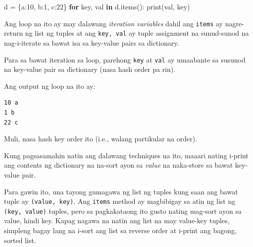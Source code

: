 \documentclass[10pt,]{book}
\newenvironment{Shaded}{}{}
\newcommand{\BuiltInTok}[1]{\textcolor[rgb]{0.00,0.50,0.00}{#1}}
\newcommand{\ControlFlowTok}[1]{\textcolor[rgb]{0.00,0.44,0.13}{\textbf{#1}}}
\newcommand{\DecValTok}[1]{\textcolor[rgb]{0.25,0.63,0.44}{#1}}
\newcommand{\KeywordTok}[1]{\textcolor[rgb]{0.00,0.44,0.13}{\textbf{#1}}}
\newcommand{\NormalTok}[1]{#1}
\newcommand{\OperatorTok}[1]{\textcolor[rgb]{0.40,0.40,0.40}{#1}}
\newcommand{\StringTok}[1]{\textcolor[rgb]{0.25,0.44,0.63}{#1}}
\begin{document}
\begin{Shaded}
\begin{Highlighting}[]
\NormalTok{d }\OperatorTok{=}\NormalTok{ \{}\StringTok{\textquotesingle{}a\textquotesingle{}}\NormalTok{:}\DecValTok{10}\NormalTok{, }\StringTok{\textquotesingle{}b\textquotesingle{}}\NormalTok{:}\DecValTok{1}\NormalTok{, }\StringTok{\textquotesingle{}c\textquotesingle{}}\NormalTok{:}\DecValTok{22}\NormalTok{\}}
\ControlFlowTok{for}\NormalTok{ key, val }\KeywordTok{in}\NormalTok{ d.items():}
    \BuiltInTok{print}\NormalTok{(val, key)}
\end{Highlighting}
\end{Shaded}

Ang loop na ito ay may dalawang \emph{iteration variables} dahil ang
\texttt{items} ay nagre-return ng list ng tuples at ang
\texttt{key,\ val} ay tuple assignment na sunud-sunod na nag-i-iterate
sa bawat isa sa key-value pairs sa dictionary.

Para sa bawat iteration sa loop, parehong \texttt{key} at \texttt{val}
ay umaabante sa susunod na key-value pair sa dictionary (nasa hash order
pa rin).

Ang output ng loop na ito ay:

{\small
\begin{verbatim}
10 a
1 b
22 c
\end{verbatim}
}

Muli, nasa hash key order ito (i.e., walang partikular na order).

Kung pagsasamahin natin ang dalawang techniques na ito, maaari nating
i-print ang contents ng dictionary na na-sort ayon sa \emph{value} na
naka-store sa bawat key-value pair.

Para gawin ito, una tayong gumagawa ng list ng tuples kung saan ang
bawat tuple ay \texttt{(value,\ key)}. Ang \texttt{items} method ay
magbibigay sa atin ng list ng \texttt{(key,\ value)} tuples, pero sa
pagkakataong ito gusto nating mag-sort ayon sa value, hindi key. Kapag
nagawa na natin ang list na may value-key tuples, simpleng bagay lang na
i-sort ang list sa reverse order at i-print ang bagong, sorted list.
\end{document}
